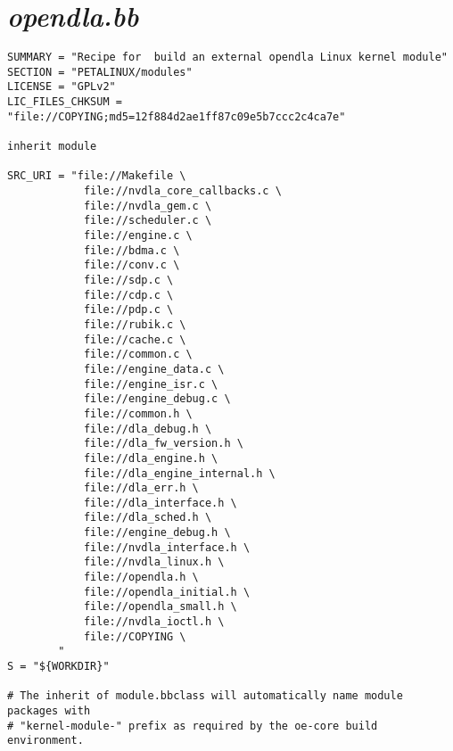 \section{\emph{opendla.bb}}

\begin{lstlisting}
SUMMARY = "Recipe for  build an external opendla Linux kernel module"
SECTION = "PETALINUX/modules"
LICENSE = "GPLv2"
LIC_FILES_CHKSUM = "file://COPYING;md5=12f884d2ae1ff87c09e5b7ccc2c4ca7e"

inherit module

SRC_URI = "file://Makefile \
            file://nvdla_core_callbacks.c \
            file://nvdla_gem.c \
            file://scheduler.c \
            file://engine.c \
            file://bdma.c \
            file://conv.c \
            file://sdp.c \
            file://cdp.c \
            file://pdp.c \
            file://rubik.c \
            file://cache.c \
            file://common.c \
            file://engine_data.c \
            file://engine_isr.c \
            file://engine_debug.c \
            file://common.h \
            file://dla_debug.h \
            file://dla_fw_version.h \
            file://dla_engine.h \
            file://dla_engine_internal.h \
            file://dla_err.h \
            file://dla_interface.h \
            file://dla_sched.h \
            file://engine_debug.h \
            file://nvdla_interface.h \
            file://nvdla_linux.h \
            file://opendla.h \
            file://opendla_initial.h \
            file://opendla_small.h \
            file://nvdla_ioctl.h \
            file://COPYING \
        "
S = "${WORKDIR}"

# The inherit of module.bbclass will automatically name module packages with
# "kernel-module-" prefix as required by the oe-core build environment.
\end{lstlisting}
